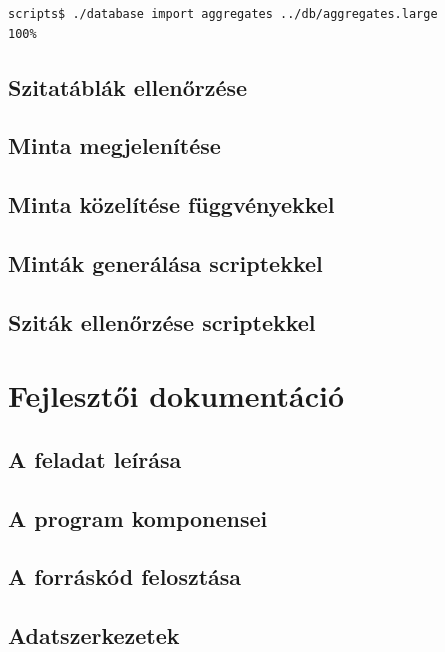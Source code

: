 \documentclass[12pt]{report}
\begin{document}
\tiny
\begin{lstlisting}[language=bash]
scripts$ ./database import aggregates ../db/aggregates.large
100%
\end{lstlisting}
\small

\section{Szitatáblák ellenőrzése}

\section{Minta megjelenítése}

\section{Minta közelítése függvényekkel}

\section{Minták generálása scriptekkel}

\section{Sziták ellenőrzése scriptekkel}


\chapter{Fejlesztői dokumentáció}

\section{A feladat leírása}

\section{A program komponensei}

\section{A forráskód felosztása}

\section{Adatszerkezetek}
\end{document}
